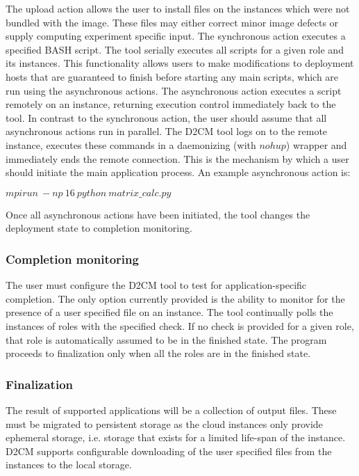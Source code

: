 \documentclass[a4paper,10pt]{article}
\begin{document}
The upload action allows the user to install files on the instances which were not bundled with the image. These files may either correct minor image defects or supply computing experiment specific input. The synchronous action executes a specified BASH script. The tool serially executes all scripts for a given role and its instances. This functionality allows users to make modifications to deployment hosts that are guaranteed to finish before starting any main scripts, which are run using the asynchronous actions. The asynchronous action executes a script remotely on an instance, returning execution control immediately back to the tool. In contrast to the synchronous action, the user should assume that all asynchronous actions run in parallel. The D2CM tool logs on to the remote instance, executes these commands in a daemonizing (with $nohup$) wrapper and immediately ends the remote connection. This is the mechanism by which a user should initiate the main application process. An example asynchronous action is:

$mpirun~-np~16~python~matrix{\_}calc.py$

Once all asynchronous actions have been initiated, the tool changes the deployment state to completion monitoring.

\subsubsection{Completion monitoring}

The user must configure the D2CM tool to test for application-specific completion. The only option currently provided is the ability to monitor for the presence of a user specified file on an instance. The tool continually polls the instances of roles with the specified check. If no check is provided for a given role, that role is automatically assumed to be in the finished state. The program proceeds to finalization only when all the roles are in the finished state.

\subsubsection{Finalization}

The result of supported applications will be a collection of output files. These must be migrated to persistent storage as the cloud instances only provide ephemeral storage, i.e. storage that exists for a limited life-span of the instance. D2CM supports configurable downloading of the user specified files from the instances to the local storage. 
\end{document}
